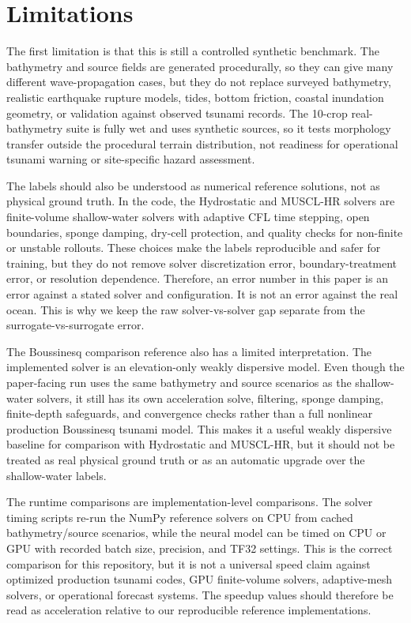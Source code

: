 \section{Limitations}
\label{sec:limitations}

The first limitation is that this is still a controlled synthetic benchmark. The bathymetry and source fields are generated procedurally, so they can give many different wave-propagation cases, but they do not replace surveyed bathymetry, realistic earthquake rupture models, tides, bottom friction, coastal inundation geometry, or validation against observed tsunami records. The 10-crop real-bathymetry suite is fully wet and uses synthetic sources, so it tests morphology transfer outside the procedural terrain distribution, not readiness for operational tsunami warning or site-specific hazard assessment.

The labels should also be understood as numerical reference solutions, not as physical ground truth. In the code, the Hydrostatic and MUSCL-HR solvers are finite-volume shallow-water solvers with adaptive CFL time stepping, open boundaries, sponge damping, dry-cell protection, and quality checks for non-finite or unstable rollouts. These choices make the labels reproducible and safer for training, but they do not remove solver discretization error, boundary-treatment error, or resolution dependence. Therefore, an error number in this paper is an error against a stated solver and configuration. It is not an error against the real ocean. This is why we keep the raw solver-vs-solver gap separate from the surrogate-vs-surrogate error.

The Boussinesq comparison reference also has a limited interpretation. The implemented solver is an elevation-only weakly dispersive model. Even though the paper-facing run uses the same bathymetry and source scenarios as the shallow-water solvers, it still has its own acceleration solve, filtering, sponge damping, finite-depth safeguards, and convergence checks rather than a full nonlinear production Boussinesq tsunami model. This makes it a useful weakly dispersive baseline for comparison with Hydrostatic and MUSCL-HR, but it should not be treated as real physical ground truth or as an automatic upgrade over the shallow-water labels.

The runtime comparisons are implementation-level comparisons. The solver timing scripts re-run the NumPy reference solvers on CPU from cached bathymetry/source scenarios, while the neural model can be timed on CPU or GPU with recorded batch size, precision, and TF32 settings. This is the correct comparison for this repository, but it is not a universal speed claim against optimized production tsunami codes, GPU finite-volume solvers, adaptive-mesh solvers, or operational forecast systems. The speedup values should therefore be read as acceleration relative to our reproducible reference implementations.

